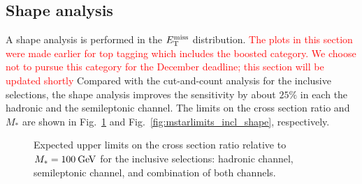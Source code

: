 \subsection{Shape analysis}
\label{subsec:shape}

A shape analysis is performed in the $E_\mathrm{T}^{\mathrm{miss}}$ distribution. \textcolor{red}{The plots in this section were made earlier for top tagging which includes the boosted category. We choose not to pursue this category for the December deadline; this section will be updated shortly} Compared with the cut-and-count analysis for the inclusive selections, the shape analysis improves the sensitivity by about $25\%$ in each the hadronic and the semileptonic channel. The limits on the cross section ratio and $M_*$ are shown in Fig.~\ref{fig:rlimits_incl_shape} and Fig.~\ref{fig:mstarlimits_incl_shape}, respectively.

\begin{figure}[htbp]
\begin{center}
  \caption{Expected upper limits on the cross section ratio relative to $M_*=100\:\mathrm{Ge\kern -0.1em V}$ for the inclusive selections:  hadronic channel,  semileptonic channel, and  combination of both channels.}
  \label{fig:rlimits_incl_shape}
\end{center}
\end{figure}

